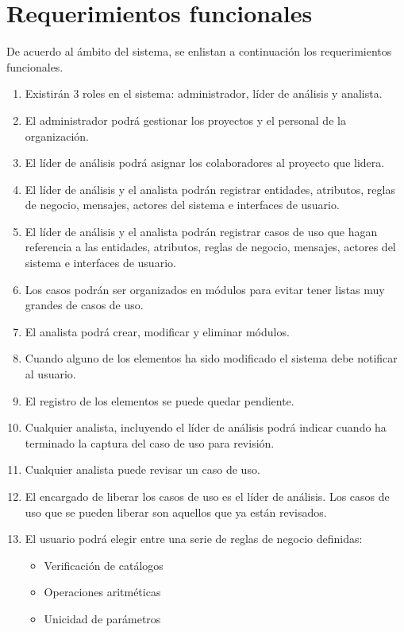 \section{Requerimientos funcionales}
De acuerdo al ámbito del sistema, se enlistan a continuación los requerimientos funcionales.
\begin{enumerate}[{\bf RF01.}]
 \item Existirán 3 roles en el sistema: administrador, líder de análisis y analista.
 \item El administrador podrá gestionar los proyectos y el personal de la organización.
 \item El líder de análisis podrá asignar los colaboradores al proyecto que lidera.
 \item El líder de análisis y el analista podrán registrar entidades, atributos, reglas de negocio, mensajes, actores del sistema e interfaces de usuario.
 \item El líder de análisis y el analista podrán registrar casos de uso que hagan referencia a las entidades, atributos, reglas de negocio, mensajes, actores del sistema e interfaces de usuario.
 \item Los casos podrán ser organizados en módulos para evitar tener listas muy grandes de casos de uso.
 \item El analista podrá crear, modificar y eliminar módulos.
 \item Cuando alguno de los elementos ha sido modificado el sistema debe notificar al usuario.
 \item El registro de los elementos se puede quedar pendiente.
 \item Cualquier analista, incluyendo el líder de análisis podrá indicar cuando ha terminado la captura del caso de uso para revisión.
 \item Cualquier analista puede revisar un caso de uso.
 \item El encargado de liberar los casos de uso es el líder de análisis. Los casos de uso que se pueden liberar son aquellos que ya están revisados.
 \item El usuario podrá elegir entre una serie de reglas de negocio definidas:
	\begin{itemize}
		\item Verificación de catálogos
		\item Operaciones aritméticas
		\item Unicidad de parámetros

\end{itemize}
\end{enumerate}
